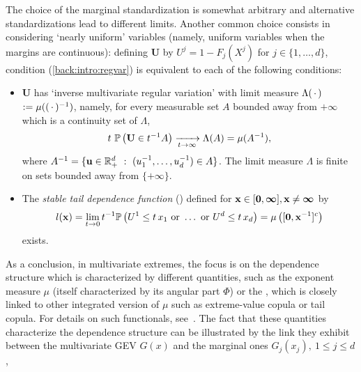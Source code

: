 The choice of the marginal standardization is somewhat arbitrary and alternative standardizations  lead
to different limits. Another common choice consists in considering `nearly
uniform' 
variables (namely, uniform variables when the margins are continuous): defining $\mathbf{U}$ by $U^j =1-F_j(X^j)$ for
$j\in\{1,\ldots,d\}$,   %
condition (\ref{back:intro:regvar}) is equivalent to each of the  following conditions:
\begin{itemize}
\item $\mathbf{U}$ has  `inverse multivariate regular variation' %
  with limit measure $\Lambda(\,\cdot\,)$ $:=\mu((\,\cdot\,)^{-1})$, namely,
  for every measurable set $A$ bounded away from $+\boldsymbol{\infty}$ which is a
  continuity set of $\Lambda$,
\begin{align}
\label{back:reg_var_U}
t~ \mathbb{P}\left( \mathbf U \in t^{-1} A\right)
\xrightarrow[t\to\infty]{} \Lambda(A) = \mu(A^{-1}), 
\end{align}
where $A^{-1} = \{\mathbf u \in \mathbb{R}^{d}_+ ~:~(u_1^{-1},\ldots,u_d^{-1})
\in A\}$. The limit measure $\Lambda$ is finite on sets bounded away from $\{+\boldsymbol{\infty}\}$. 
\item The \textit{stable tail dependence function} (\stdf) defined for $\mathbf x\in[\mathbf 0,\boldsymbol{\infty}], \mathbf x\neq\boldsymbol{\infty}$ by 
\begin{align}
\label{back:stdf1}
l(\mathbf x) = \lim_{t \to 0} t^{-1} \mathbb{P} \left( U^1 \le t\, x_1 ~\text{or}~ \ldots ~\text{or}~ U^d \le t\,x_d  \right)
 = \mu\left([\mathbf 0, \mathbf{x}^{-1}]^c\right) 
\end{align}
exists. 
\end{itemize}

As a conclusion, in multivariate extremes, the focus is on the dependence structure which is characterized by different quantities, such as the exponent measure $\mu$ (itself characterized by its angular part $\Phi$) or the \stdf, which is closely linked to other integrated version of $\mu$ such as extreme-value copula or tail copula. For details on such 
functionals, see~\cite{Segers12}.
The fact that these quantities characterize the dependence structure can be illustrated by the link they exhibit between the multivariate GEV $G(x)$ and the marginal ones $G_j(x_j),~1 \le j \le d$,

